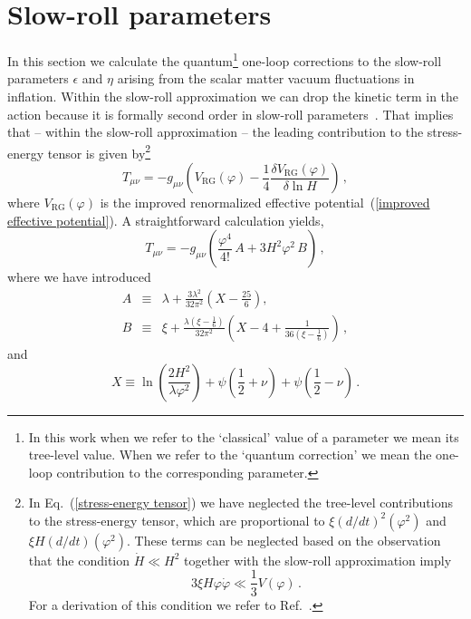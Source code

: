 \documentclass[aps,12pt,superscriptaddress,preprintnumbers,
                secnumarabic,nofootinbib,showpacs]{revtex4}
\begin{document}
\section{Slow-roll parameters}
\label{Slow-roll parameters}

 In this section we calculate the quantum\footnote{In this work when we
refer to the `classical' value of a parameter we mean
its tree-level value. When we refer to the `quantum correction' we
mean the one-loop contribution to the corresponding parameter.}
one-loop corrections to the slow-roll parameters $\epsilon $ and $\eta$
arising from the scalar matter vacuum fluctuations in inflation.
 Within the slow-roll approximation we can drop the kinetic term in
the action because it is formally second order in slow-roll
parameters~\cite{Liddle:2000cg}. That implies that -- within the
slow-roll approximation -- the leading contribution to the
stress-energy tensor is given by\footnote{In
Eq.~(\ref{stress-energy tensor}) we have neglected the tree-level
contributions to the stress-energy tensor, which are proportional
to $\xi(d/dt)^2(\varphi^2)$ and $\xi H(d/dt)(\varphi^2)$.
 These terms can be neglected based on the observation that the condition
$\dot{H}\ll H^2$ together with the slow-roll approximation imply
\begin{equation}
3\xi H\varphi\dot{\varphi}\ll \frac13 V(\varphi)\,.
\end{equation}
For a derivation of this condition we refer to
Ref.~\cite{Ante:thesis}.}
\begin{equation}
T_{\mu\nu} = -
g_{\mu\nu}\left(V_{\mathrm{RG}}(\varphi)-\frac14\frac{\delta
V_{\mathrm{RG}}(\varphi)}{\delta\ln H}\right)
\,,
\label{stress-energy tensor}
\end{equation}
where $V_{\mathrm{RG}}(\varphi)$ is the improved renormalized
effective potential~(\ref{improved effective potential}).
A straightforward calculation yields,
\begin{equation}
T_{\mu\nu} = - g_{\mu\nu}\left(\frac{\varphi^4}{4!}\, A
+3H^2\varphi^2\, B\right)\,,
\label{stress-energy tensor2}
\end{equation}
where we have introduced
\begin{eqnarray}
A & \equiv & \lambda
  + \frac{3\lambda^2}{32\pi^2}\left(X-\frac{25}{6}\right),\nonumber\\
B & \equiv & \xi
+\frac{\lambda(\xi-\frac16)}{32\pi^2}\left(X-4+\frac{1}{36(\xi-\frac16)}\right)
\,,
\label{AB}
\end{eqnarray}
and
\begin{equation}
X\equiv \ln\left(\frac{2H^2}{\lambda\varphi^2}\right) +
\psi\left(\frac12+\nu\right) + \psi\left(\frac12-\nu\right)
\,.
\label{X}
\end{equation}
\end{document}
